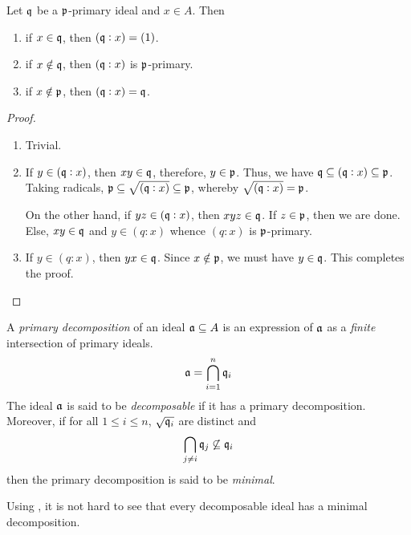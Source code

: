 \begin{lemma}
    Let $\mathfrak q$ be a $\mathfrak p$-primary ideal and $x\in A$. Then 
    \begin{enumerate}[label=(\alph*)]
        \item if $x\in\mathfrak q$, then $(\mathfrak q: x) = (1)$.
        \item if $x\notin\mathfrak q$, then $(\mathfrak q: x)$ is $\mathfrak p$-primary.
        \item if $x\notin\mathfrak p$, then $(\mathfrak q: x) = \mathfrak q$.
    \end{enumerate}
\end{lemma}
\begin{proof}
\begin{enumerate}[label=(\alph*)]
    \item Trivial.
    \item If $y\in(\mathfrak q:x)$, then $xy\in\mathfrak q$, therefore, $y\in\mathfrak p$. Thus, we have $\mathfrak q\subseteq(\mathfrak q:x)\subseteq\mathfrak p$. Taking radicals, $\mathfrak p\subseteq\sqrt{(\mathfrak q:x)}\subseteq\mathfrak p$, whereby $\sqrt{(\mathfrak q: x)} = \mathfrak p$.

    On the other hand, if $yz\in(\mathfrak q: x)$, then $xyz\in\mathfrak q$. If $z\in\mathfrak p$, then we are done. Else, $xy\in\mathfrak q$ and $y\in(q:x)$ whence $(q: x)$ is $\mathfrak p$-primary.
    \item If $y\in(q: x)$, then $yx\in\mathfrak q$. Since $x\notin\mathfrak p$, we must have $y\in\mathfrak q$. This completes the proof.
\end{enumerate}
\end{proof}

\begin{definition}
    A \textit{primary decomposition} of an ideal $\mathfrak a\subseteq A$ is an expression of $\mathfrak a$ as a \textit{finite} intersection of primary ideals.
    \begin{equation*}
        \mathfrak a = \bigcap_{i = 1}^n\mathfrak q_i
    \end{equation*}
    The ideal $\mathfrak a$ is said to be \textit{decomposable} if it has a primary decomposition. Moreover, if for all $1\le i\le n$, $\sqrt{\mathfrak q_i}$ are distinct and 
    \begin{equation*}
        \bigcap_{j\ne i}\mathfrak q_j\not\subseteq\mathfrak q_i
    \end{equation*}
    then the primary decomposition is said to be \textit{minimal}.
\end{definition}

Using , it is not hard to see that every decomposable ideal has a minimal decomposition.

